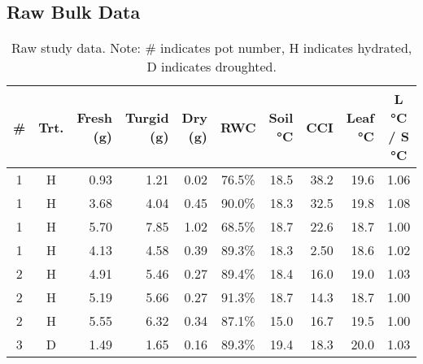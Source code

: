 \documentclass{report}
\begin{document}
\subsection{Raw Bulk Data}

\begin{table}[h]
    \caption{Raw study data. Note: \# indicates pot number, H indicates hydrated, D indicates droughted.}
    \begin{tabular}{c|c|r|r|r|c|r|r|r|c}
    \textbf{\#} & \textbf{Trt.} & \textbf{Fresh (g)} & \textbf{Turgid (g)} & \textbf{Dry (g)} & \textbf{RWC} & \textbf{Soil °C} & \textbf{CCI} & \textbf{Leaf °C} & \textbf{L °C / S °C} \\ \hline
    1            & H             & 0.93               & 1.21                & 0.02             & 76.5\%            & 18.5                     & 38.2         & 19.6                     & 1.06         \\ \hline
    1            & H             & 3.68               & 4.04                & 0.45             & 90.0\%            & 18.3                     & 32.5         & 19.8                     & 1.08         \\ \hline
    1            & H             & 5.70               & 7.85                & 1.02             & 68.5\%            & 18.7                     & 22.6         & 18.7                     & 1.00         \\ \hline
    1            & H             & 4.13               & 4.58                & 0.39             & 89.3\%            & 18.3                     & 2.50         & 18.6                     & 1.02         \\ \hline
    2            & H             & 4.91               & 5.46                & 0.27             & 89.4\%            & 18.4                     & 16.0         & 19.0                     & 1.03         \\ \hline
    2            & H             & 5.19               & 5.66                & 0.27             & 91.3\%            & 18.7                     & 14.3         & 18.7                     & 1.00         \\ \hline
    2            & H             & 5.55               & 6.32                & 0.34             & 87.1\%            & 15.0                     & 16.7         & 19.5                     & 1.00         \\ \hline
    3            & D             & 1.49               & 1.65                & 0.16             & 89.3\%            & 19.4                     & 18.3         & 20.0                     & 1.03         \\ \hline

\end{tabular}
\end{table}
\end{document}
